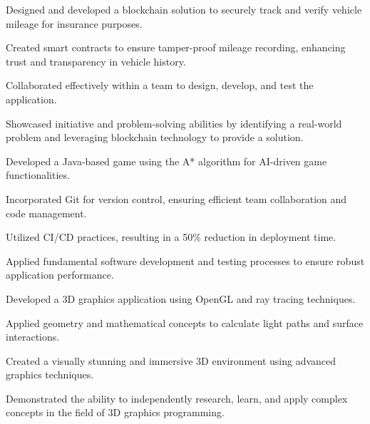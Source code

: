 \begin{minipage}[t]{0.63\textwidth}
    \vspace{5pt}
    \begin{tightemize}
      \item Designed and developed a blockchain solution to securely track and verify vehicle mileage for insurance purposes.
      \item Created smart contracts to ensure tamper-proof mileage recording, enhancing trust and transparency in vehicle history.
      \item Collaborated effectively within a team to design, develop, and test the application.
      \item Showcased initiative and problem-solving abilities by identifying a real-world problem and leveraging blockchain technology to provide a solution.
    \end{tightemize}
  \sectionsep

    \vspace{5pt}
    \begin{tightemize}
      \item Developed a Java-based game using the A* algorithm for AI-driven game functionalities.
      \item Incorporated Git for version control, ensuring efficient team collaboration and code management.
      \item Utilized CI/CD practices, resulting in a 50\% reduction in deployment time.
      \item Applied fundamental software development and testing processes to ensure robust application performance.
    \end{tightemize}
  \sectionsep

    \vspace{5pt}
    \begin{tightemize}
      \item Developed a 3D graphics application using OpenGL and ray tracing techniques.
      \item Applied geometry and mathematical concepts to calculate light paths and surface interactions.
      \item Created a visually stunning and immersive 3D environment using advanced graphics techniques.
      \item Demonstrated the ability to independently research, learn, and apply complex concepts in the field of 3D graphics programming.
    \end{tightemize}
  \sectionsep


\end{minipage}
